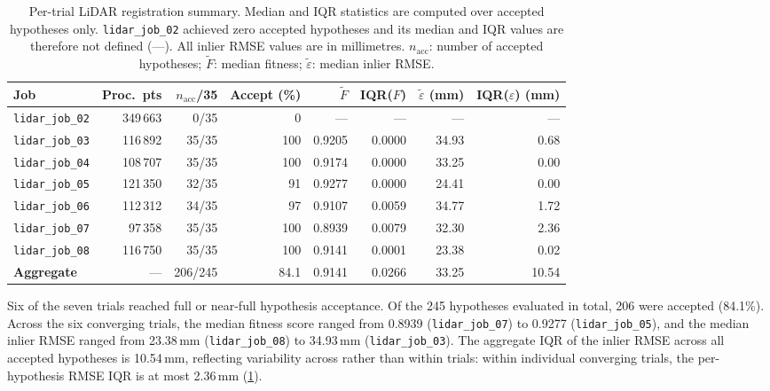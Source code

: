 \begin{table}[htbp]
  \centering
  \small
  \setlength{\tabcolsep}{4pt}
  \caption{Per-trial LiDAR registration summary. Median and IQR statistics are computed over accepted hypotheses only. \texttt{lidar\_job\_02} achieved zero accepted hypotheses and its median and IQR values are therefore not defined (---). All inlier RMSE values are in millimetres. $n_\text{acc}$: number of accepted hypotheses; $\tilde{F}$: median fitness; $\tilde{\varepsilon}$: median inlier RMSE.}
  \label{tab:pa-results-per-job}
  \begin{tabular}{@{} l r r r r r r r @{}}
    \toprule
    \textbf{Job} &
    \textbf{Proc.\ pts} &
    \boldmath$n_\text{acc}$\textbf{/35} &
    \textbf{Accept (\%)} &
    \boldmath$\tilde{F}$ &
    \textbf{IQR(}\boldmath$F$\textbf{)} &
    \boldmath$\tilde{\varepsilon}$ \textbf{(mm)} &
    \textbf{IQR(}\boldmath$\varepsilon$\textbf{) (mm)} \\
    \midrule
    \texttt{lidar\_job\_02} & 349\,663 &  0/35 &   0 &    ---    &   ---    &  ---   &   ---  \\
    \texttt{lidar\_job\_03} & 116\,892 & 35/35 & 100 & 0.9205 & 0.0000 & 34.93 & 0.68 \\
    \texttt{lidar\_job\_04} & 108\,707 & 35/35 & 100 & 0.9174 & 0.0000 & 33.25 & 0.00 \\
    \texttt{lidar\_job\_05} & 121\,350 & 32/35 &  91 & 0.9277 & 0.0000 & 24.41 & 0.00 \\
    \texttt{lidar\_job\_06} & 112\,312 & 34/35 &  97 & 0.9107 & 0.0059 & 34.77 & 1.72 \\
    \texttt{lidar\_job\_07} &  97\,358 & 35/35 & 100 & 0.8939 & 0.0079 & 32.30 & 2.36 \\
    \texttt{lidar\_job\_08} & 116\,750 & 35/35 & 100 & 0.9141 & 0.0001 & 23.38 & 0.02 \\
    \midrule
    \textbf{Aggregate} & --- & 206/245 & 84.1 & 0.9141 & 0.0266 & 33.25 & 10.54 \\
    \bottomrule
  \end{tabular}
\end{table}

Six of the seven trials reached full or near-full hypothesis acceptance. Of the 245 hypotheses evaluated in total, 206 were accepted (84.1\%). Across the six converging trials, the median fitness score ranged from 0.8939 (\texttt{lidar\_job\_07}) to 0.9277 (\texttt{lidar\_job\_05}), and the median inlier RMSE ranged from 23.38\,mm (\texttt{lidar\_job\_08}) to 34.93\,mm (\texttt{lidar\_job\_03}). The aggregate IQR of the inlier RMSE across all accepted hypotheses is 10.54\,mm, reflecting variability across rather than within trials: within individual converging trials, the per-hypothesis RMSE IQR is at most 2.36\,mm (\cref{tab:pa-results-per-job}).

